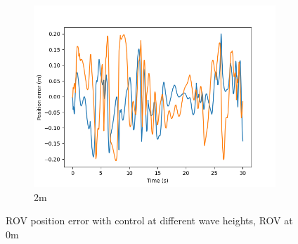 \documentclass[class=article, crop=false]{standalone}
\begin{document}
\begin{figure}
\begin{subfigure}[b]{0.48\textwidth}
        \centering
        \includegraphics{scenario1/rov-0m/2.0m/rov_position_error_controlled}
        \caption{2m}
        \label{}
    \end{subfigure}

    \caption{ROV position error with control at different wave heights, ROV at 0m}
\end{figure}
\end{document}
